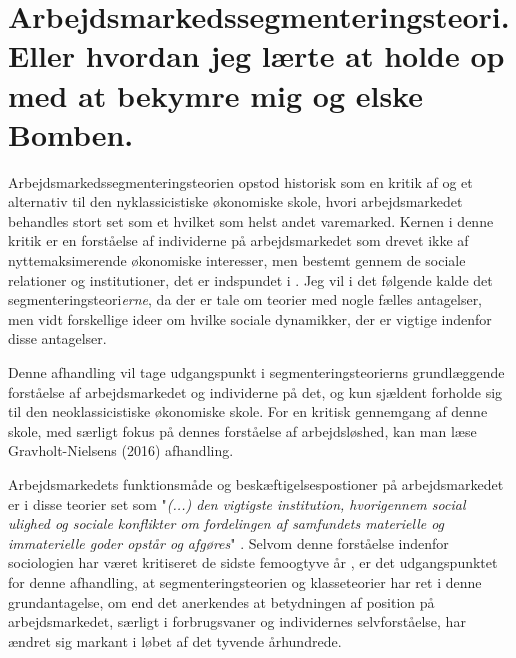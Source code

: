 
\section{Arbejdsmarkedssegmenteringsteori. Eller hvordan jeg lærte at holde op med at bekymre mig og elske Bomben.}


Arbejdsmarkedssegmenteringsteorien opstod historisk som en kritik af og et alternativ til den nyklassicistiske økonomiske skole, hvori arbejdsmarkedet behandles stort set som et hvilket som helst andet varemarked. Kernen i denne kritik er en forståelse af individerne på arbejdsmarkedet som drevet ikke af nyttemaksimerende økonomiske interesser, men bestemt gennem de sociale relationer og institutioner, det er indspundet i \parencite[171]{Boje1986}. Jeg vil i det følgende kalde det segmenteringsteori\emph{erne}, da der er tale om teorier med nogle fælles antagelser, men vidt forskellige ideer om hvilke sociale dynamikker, der er vigtige indenfor disse antagelser.

Denne afhandling vil tage udgangspunkt i segmenteringsteorierns grundlæggende forståelse af  arbejdsmarkedet og individerne på det, og kun sjældent forholde sig til den neoklassicistiske økonomiske skole. For en kritisk gennemgang af denne skole, med særligt fokus på dennes forståelse af arbejdsløshed, kan man læse Gravholt-Nielsens (2016) afhandling. 

Arbejdsmarkedets funktionsmåde og beskæftigelsespostioner på arbejdsmarkedet er i disse teorier set som "\emph{(...) den vigtigste institution, hvorigennem social ulighed og sociale konflikter om fordelingen af samfundets materielle og immaterielle goder opstår og afgøres}" \parencite[10]{Boje1985}. Selvom denne forståelse indenfor sociologien har været kritiseret de sidste femoogtyve år \parencite[23]{Scott2000}, er det udgangspunktet for denne afhandling, at segmenteringsteorien og klasseteorier har ret i denne grundantagelse, om end det anerkendes at betydningen af position på arbejdsmarkedet, særligt i forbrugsvaner og individernes selvforståelse, har ændret sig markant i løbet af det tyvende århundrede. 

